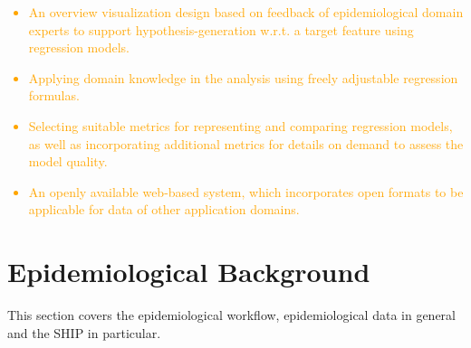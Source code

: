 \documentclass[journal]{style/vgtc} 			          %
\newcommand{\design}[1]{\textcolor{orange}{#1}}
\begin{document}
\design{
\begin{itemize}
  \item An overview visualization design based on feedback of epidemiological domain experts to support hypothesis-generation w.r.t. a target feature using regression models.
  \item Applying domain knowledge in the analysis using freely adjustable regression formulas.
  \item Selecting suitable metrics for representing and comparing regression models, as well as incorporating additional metrics for details on demand to assess the model quality.
  \item An openly available web-based system, which incorporates open formats to be applicable for data of other application domains.
\end{itemize}
}
\section{Epidemiological Background} \label{sec:Background}
This section covers the epidemiological workflow, epidemiological data in general and the SHIP in particular.
\end{document}
